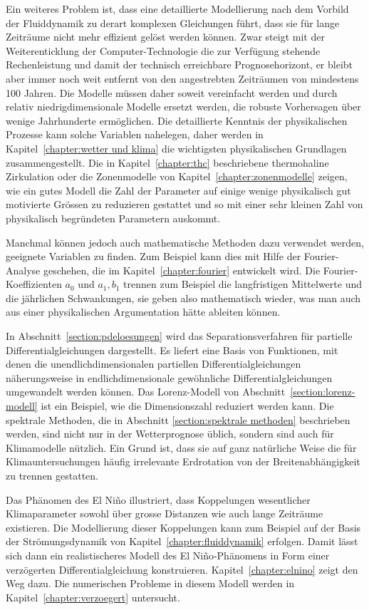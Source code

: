 Ein weiteres Problem ist, dass eine detaillierte Modellierung nach dem
Vorbild der Fluiddynamik zu derart komplexen Gleichungen führt, dass 
sie für lange Zeiträume nicht mehr effizient gelöst werden können.
Zwar steigt mit der Weiterenticklung der Computer-Technologie die 
zur Verfügung stehende Rechenleistung und damit der technisch erreichbare
Prognosehorizont, er bleibt aber immer noch weit entfernt von den
angestrebten Zeiträumen von mindestens 100 Jahren.
Die Modelle müssen daher soweit vereinfacht werden und durch relativ
niedrigdimensionale Modelle ersetzt werden, die robuste Vorhersagen
über wenige Jahrhunderte ermöglichen.
Die detaillierte Kenntnis der physikalischen Prozesse kann solche 
Variablen nahelegen, daher werden in Kapitel~\ref{chapter:wetter und klima}
die wichtigsten physikalischen Grundlagen zusammengestellt.
Die in Kapitel~\ref{chapter:thc} beschriebene thermohaline Zirkulation
oder die Zonenmodelle von Kapitel~\ref{chapter:zonenmodelle}
zeigen, wie ein gutes Modell die Zahl der Parameter auf einige wenige
physikalisch gut motivierte Grössen zu reduzieren gestattet und 
so mit einer sehr kleinen Zahl von physikalisch begründeten
Parametern auskommt.

Manchmal können jedoch auch mathematische Methoden dazu verwendet werden,
geeignete Variablen zu finden.
Zum Beispiel kann dies mit Hilfe der Fourier-Analyse geschehen, die
im Kapitel~\ref{chapter:fourier} entwickelt wird.
Die Fourier-Koeffizienten $a_0$ und $a_1,b_1$ trennen zum Beispiel die
langfristigen Mittelwerte und die jährlichen Schwankungen, sie geben
also mathematisch wieder, was man auch aus einer physikalischen
Argumentation hätte ableiten können.

In Abschnitt~\ref{section:pdeloesungen} wird das Separationsverfahren 
für partielle Differentialgleichungen dargestellt.
Es liefert eine Basis von Funktionen, mit denen die unendlichdimensionalen
partiellen Differentialgleichungen näherungsweise in endlichdimensionale
gewöhnliche Differentialgleichungen umgewandelt werden können.
Das Lorenz-Modell von Abschnitt~\ref{section:lorenz-modell} ist ein
Beispiel, wie die Dimensionszahl reduziert werden kann.
Die spektrale Methoden, die in Abschnitt \ref{section:spektrale methoden}
beschrieben werden, sind nicht nur in der Wetterprognose üblich, sondern
sind auch für Klimamodelle nützlich.
Ein Grund ist, dass sie auf ganz natürliche Weise die für
Klimauntersuchungen häufig irrelevante Erdrotation von der
Breitenabhängigkeit zu trennen gestatten.

Das Phänomen des El Niño illustriert, dass Koppelungen wesentlicher
Klimaparameter sowohl über grosse Distanzen wie auch lange Zeiträume
existieren.
Die Modellierung dieser Koppelungen kann zum Beispiel auf der Basis
der Strömungsdynamik von Kapitel~\ref{chapter:fluiddynamik} erfolgen.
Damit lässt sich dann ein realistischeres Modell des El Niño-Phänomens
in Form einer verzögerten Differentialgleichung konstruieren.
Kapitel~\ref{chapter:elnino} zeigt den Weg dazu.
Die numerischen Probleme in diesem Modell werden in
Kapitel~\ref{chapter:verzoegert} untersucht.

